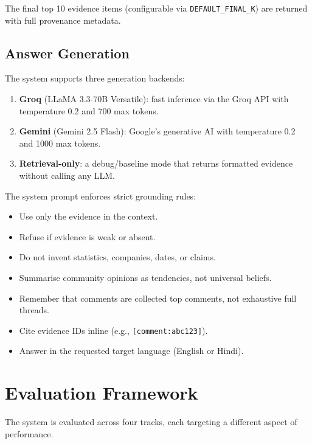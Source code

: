 \documentclass[11pt,a4paper]{article}
\begin{document}
The final top 10 evidence items (configurable via \texttt{DEFAULT\_FINAL\_K}) are returned with full provenance metadata.


\subsection{Answer Generation}
\label{sec:generation}

The system supports three generation backends:

\begin{enumerate}[leftmargin=*]
  \item \textbf{Groq} (LLaMA 3.3-70B Versatile): fast inference via the Groq API with temperature 0.2 and 700 max tokens.
  \item \textbf{Gemini} (Gemini 2.5 Flash): Google's generative AI with temperature 0.2 and 1000 max tokens.
  \item \textbf{Retrieval-only}: a debug/baseline mode that returns formatted evidence without calling any LLM.
\end{enumerate}

The system prompt enforces strict grounding rules:
\begin{itemize}[leftmargin=*]
  \item Use only the evidence in the context.
  \item Refuse if evidence is weak or absent.
  \item Do not invent statistics, companies, dates, or claims.
  \item Summarise community opinions as tendencies, not universal beliefs.
  \item Remember that comments are collected top comments, not exhaustive full threads.
  \item Cite evidence IDs inline (e.g., \texttt{[comment:abc123]}).
  \item Answer in the requested target language (English or Hindi).
\end{itemize}


\section{Evaluation Framework}
\label{sec:eval}

The system is evaluated across four tracks, each targeting a different aspect of performance.
\end{document}
